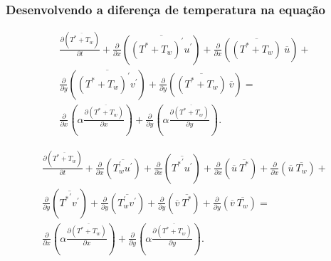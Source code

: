 \documentclass[xcolor=dvipsnames,10pt,aspectratio=169]{beamer}
\begin{document}
		
		
		
		\begin{frame}
		\frametitle{Desenvolvendo a diferença de temperatura na equação}
		\begin{equation}
		\begin{split}
		\frac{\partial ( \overline{T^\ast + T_w}  ) }{\partial t} +
		\frac{\partial{}}{\partial{x}} \left(\overline{(T^\ast + T_w)^\prime u^\prime}\right) + \frac{\partial{}}{\partial{x}}\left(\overline{(T^\ast + T_w)} \ \overline{u}\right)+  \\
		\frac{\partial{}}{\partial{y}} \left(\overline{(T^\ast + T_w)^\prime v^\prime}\right) + \frac{\partial{}}{\partial{y}}\left(\overline{(T^\ast + T_w)} \ \overline{v}\right) = \\
		{\frac{\partial{}}{\partial{x}}} \left(\alpha {\frac{\partial{\overline{(T^\ast + T_w)}}}{\partial{x}}} \right) +
		{\frac{\partial{}}{\partial{y}}} \left(\alpha {\frac{\partial{\overline{(T^\ast + T_w)}}}{\partial{y}}} \right) .
		\end{split}
		\end{equation}
		\begin{center}\begin{equation}\begin{split}
		\frac{\partial ( \overline{ T^\ast + T_w } ) }{\partial t} +
		\frac{\partial{}}{\partial{x}} \left(\overline{T_w^{\prime} u^{\prime}}\right) +\frac{\partial{}}{\partial{x}} \left(\overline{{T^{\ast}}^{\prime} u^{\prime}}\right)
		+\frac{\partial{}}{\partial{x}}\left(\overline{u} \ \overline{T^{\ast}}\right)+ 
		\frac{\partial{}}{\partial{x}}\left(\overline{u} \ \overline{T_w}\right)+ 
		\\
		\frac{\partial{}}{\partial{y}} \left(\overline{{T^{\ast}}^{\prime} v^{\prime}}\right)+
		\frac{\partial{}}{\partial{y}} \left(\overline{T_w^\prime v^\prime}\right) + \frac{\partial{}}{\partial{y}}\left(\overline{v} \ \overline{T^\ast}\right) +
		\frac{\partial{}}{\partial{y}}\left(\overline{v} \ \overline{T_w}\right) 
		= 
		\\
		{\frac{\partial{}}{\partial{x}}} \left(\alpha {\frac{\partial{\overline{(T^\ast + T_w)}}}{\partial{x}}} \right) +
		{\frac{\partial{}}{\partial{y}}} \left(\alpha {\frac{\partial{\overline{(T^\ast + T_w)}}}{\partial{y}}} \right) .
		\end{split}\end{equation}\end{center}
		\end{frame}
		
		
		
\end{document}
